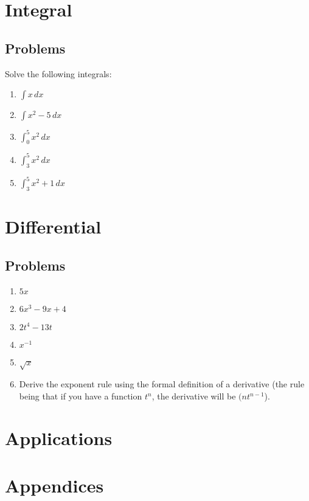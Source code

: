\documentclass{book}
\begin{document}
\part{Integral}



\chapter{Problems}
Solve the following integrals:

\begin{enumerate}
    \item $\int x \, dx$
    \item $\int x^2-5 \, dx$
    \item $\int^5_0 x^2 \, dx$
    \item $\int^5_3 x^2 \, dx$
    \item $\int^5_3 x^2 + 1 \, dx$
\end{enumerate}

\part{Differential}



\chapter{Problems}
\begin{enumerate}
    \item $5x$
    \item $6x^3 - 9x + 4$
    \item $2t^4 - 13t$
    \item $x^{-1}$
    \item $\sqrt{x}$
    \item Derive the exponent rule using the formal definition of a derivative (the rule being that if you have a function $t^n$, the derivative will be $(nt^{n-1}$).
\end{enumerate}

\part{Applications}


\backmatter
\part{Appendices}
\appendix
\end{document}
